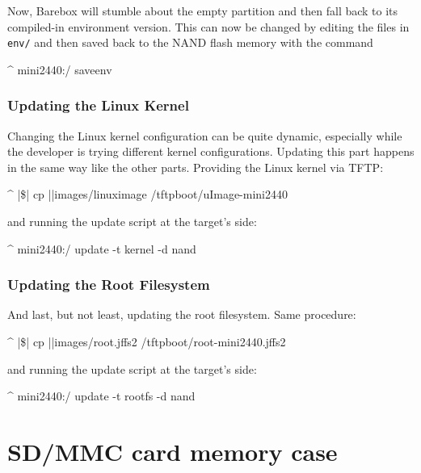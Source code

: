 Now, Barebox will stumble about the empty partition and then fall back to its
compiled-in environment version. This can now be changed by editing the files
in \texttt{env/} and then saved back to the NAND flash memory with the command

\begin{ptxshell}[escapechar=|]{^}
mini2440:/ saveenv
\end{ptxshell}

\subsubsection{Updating the Linux Kernel}

Changing the Linux kernel configuration can be quite dynamic, especially while
the developer is trying different kernel configurations. Updating this part
happens in the same way like the other parts. Providing the Linux kernel via
TFTP:

\begin{ptxshell}[escapechar=|]{^}
|\$| cp |\ptxdistPlatformDir |images/linuximage /tftpboot/uImage-mini2440
\end{ptxshell}

and running the update script at the target's side:

\begin{ptxshell}[escapechar=|]{^}
mini2440:/ update -t kernel -d nand
\end{ptxshell}

\subsubsection{Updating the Root Filesystem}

And last, but not least, updating the root filesystem. Same procedure:

\begin{ptxshell}[escapechar=|]{^}
|\$| cp |\ptxdistPlatformDir |images/root.jffs2 /tftpboot/root-mini2440.jffs2
\end{ptxshell}

and running the update script at the target's side:

\begin{ptxshell}[escapechar=|]{^}
mini2440:/ update -t rootfs -d nand
\end{ptxshell}

\section{SD/MMC card memory case}

